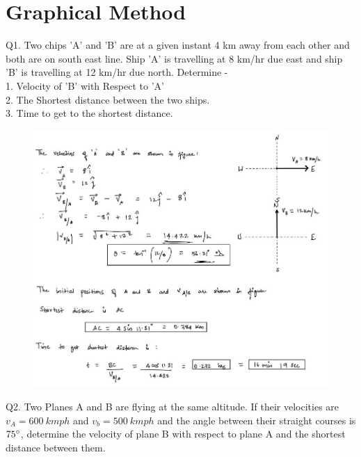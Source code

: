 \documentclass[11pt]{article}
\begin{document}
\pagebreak
\section{Graphical Method}

Q1. Two chips 'A' and 'B' are at a given instant 4 km  away from each other and both are on south east line. Ship 'A' is travelling at 8 km/hr due east and ship 'B' is travelling at 12 km/hr due north. Determine - \\
1. Velocity of 'B' with Respect to 'A'\\
2. The Shortest distance between the two ships. \\
3. Time to get to the shortest distance. \\

\begin{figure}[H]
	\includegraphics[scale=0.6]{g1.jpg}
	\label{fig: Polygon Law}
\end{figure}


\pagebreak
Q2. Two Planes A and B are flying at the same altitude. If their velocities are $ v_A = 600\ kmph $ and $ v_b = 500\ kmph $ and the angle between their straight courses is $ 75 \degree $, determine the velocity of plane B with respect to plane A and the shortest distance between them. 
\end{document}
